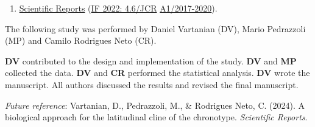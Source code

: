 \documentclass[
12pt,
openright,
oneside,
a4paper,
chapter=TITLE,
section=TITLE,
french,
spanish,
brazil,
english
]{abntex2}\usepackage{array}
\newcommand{\microskip}{\vspace{\microskipamount}}
\begin{document}
\begin{tcolorbox}[enhanced jigsaw, colframe=quarto-callout-note-color-frame, rightrule=.15mm, opacitybacktitle=0.6, toprule=.15mm, opacityback=0, toptitle=1mm, bottomtitle=1mm, breakable, leftrule=.75mm, title=\textcolor{quarto-callout-note-color}{\faInfo}\hspace{0.5em}{Target journal}, coltitle=black, bottomrule=.15mm, arc=.35mm, titlerule=0mm, left=2mm, colback=white, colbacktitle=quarto-callout-note-color!10!white]

\begin{enumerate}
\def\labelenumi{\arabic{enumi}.}
\tightlist
\item
  \href{https://www.nature.com/srep/author-instructions}{Scientific
  Reports} (\href{https://jcr.clarivate.com/jcr/}{IF 2022: 4.6/JCR}
  \textbar{}
  \href{https://sucupira.capes.gov.br/sucupira/public/consultas/coleta/veiculoPublicacaoQualis/listaConsultaGeralPeriodicos.jsf}{A1/2017-2020}).
\end{enumerate}

\end{tcolorbox}

\begin{tcolorbox}[enhanced jigsaw, colframe=quarto-callout-note-color-frame, rightrule=.15mm, opacitybacktitle=0.6, toprule=.15mm, opacityback=0, toptitle=1mm, bottomtitle=1mm, breakable, leftrule=.75mm, title=\textcolor{quarto-callout-note-color}{\faInfo}\hspace{0.5em}{Note}, coltitle=black, bottomrule=.15mm, arc=.35mm, titlerule=0mm, left=2mm, colback=white, colbacktitle=quarto-callout-note-color!10!white]

The following study was performed by Daniel Vartanian (DV), Mario
Pedrazzoli (MP) and Camilo Rodrigues Neto (CR).

\microskip

\textbf{DV} contributed to the design and implementation of the study.
\textbf{DV} and \textbf{MP} collected the data. \textbf{DV} and
\textbf{CR} performed the statistical analysis. \textbf{DV} wrote the
manuscript. All authors discussed the results and revised the final
manuscript.

\microskip

\emph{Future reference}: Vartanian, D., Pedrazzoli, M., \& Rodrigues
Neto, C. (2024). A biological approach for the latitudinal cline of the
chronotype. \emph{Scientific Reports}.

\end{tcolorbox}
\end{document}
